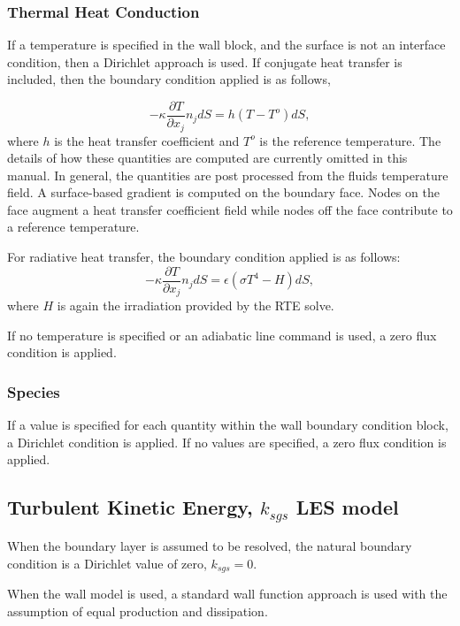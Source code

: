 \subsubsection{Thermal Heat Conduction}
If a temperature is specified in the wall block, and the surface is not an interface condition, then a Dirichlet
approach is used. If conjugate heat transfer is included, then
the boundary condition applied is as follows,

\begin{equation}
     -\kappa \frac{\partial T} {\partial x_j} n_j dS = h(T-T^o)dS,
\end{equation}
where $h$ is the heat transfer coefficient and $T^o$ is the reference
temperature. The details of how these quantities are computed are currently omitted
in this manual. In general, the quantities are post processed from the fluids temperature field. A surface-based
gradient is computed on the boundary face. Nodes on the face augment a heat transfer coefficient field while
nodes off the face contribute to a reference temperature. 

For radiative heat transfer, the boundary condition 
applied is as follows:
\begin{equation}
     -\kappa \frac{\partial T} {\partial x_j} n_j dS = \epsilon (\sigma T^4 - H) dS,
\end{equation}
where $H$ is again the irradiation provided by the RTE solve.

If no temperature is specified or an adiabatic line command is used, a zero flux condition is applied.

\subsubsection{Species}
If a value is specified for each quantity within the wall boundary condition block, a Dirichlet condition
is applied. If no values are specified, a zero flux condition is applied.

\subsection{Turbulent Kinetic Energy, $k_{sgs}$ LES model}
When the boundary layer is assumed to be resolved, the natural boundary condition is a Dirichlet value of zero, 
$k_{sgs} = 0$. 

When the wall model is used, a standard wall function approach is used with the assumption of equal production and
dissipation.

